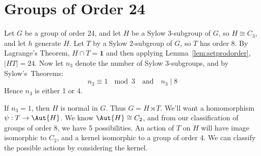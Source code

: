 \section{Groups of Order 24}
Let \(G\) be a group of order 24, and let \(H\) be a Sylow 3-subgroup of \(G\), so \(H \cong C_3\), and let \(h\)
generate \(H\).
Let \(T\) by a Sylow 2-subgroup of \(G\), so \(T\) has order 8.
By Lagrange's Theorem, \(H \cap T = \bm{1}\) and then applying Lemma~\ref{lem:setprodorder}, \(|HT| = 24\).
Now let \(n_3\) denote the number of Sylow 3-subgroups, and by Sylow's~Theorems:
\[n_3 \equiv 1\ \mod{3} \quad \text{and} \quad n_3 \mid 8\]
Hence \(n_3\) is either 1 or 4.

If \(n_3 = 1\), then \(H\) is normal in \(G\).
Thus \(G = H \rtimes T\).
We'll want a homomorphism \(\psi: T \to \Aut{H}\).
We know \(\Aut{H} \cong C_2\), and from our classification of groups of order 8, we have 5 possibilities.
An action of \(T\) on \(H\) will have image isomorphic to \(C_2\), and a kernel isomorphic to a group of order 4.
We can classify the possible actions by considering the kernel.

